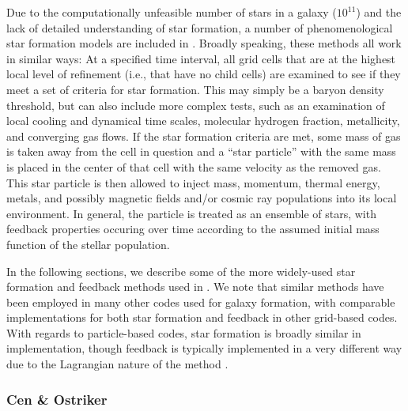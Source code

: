Due to the computationally unfeasible number of stars in a galaxy
($10^{11}$) and the lack of detailed understanding of star formation, a
number of phenomenological star formation models are included in
\enzo.
Broadly speaking, these methods all work in similar
ways: At a specified time interval, all grid cells that are at the
highest local level of refinement (i.e., that have no child cells) are
examined to see if they meet a set of criteria for star formation.
This may simply be a baryon density threshold, but can also include more
complex tests, such as an examination of local cooling and dynamical
time scales, molecular hydrogen fraction, metallicity, and converging
gas flows.  If the star formation criteria are met, some mass of gas
is taken away from the cell in question and a ``star particle'' with
the same mass is placed in the center of that cell with the same
velocity as the removed gas.  This star particle is then
allowed to inject mass, momentum, thermal energy, metals, and possibly
magnetic fields and/or cosmic ray populations into its local
environment.  In general, the particle is treated as an ensemble of
stars, with feedback properties occuring over time according to the
assumed initial mass function of the stellar population.

In the following sections, we describe some of the more widely-used
star formation and feedback methods used in \enzo.  We note that
similar methods have been employed in many other codes used for galaxy
formation, with comparable implementations for both star formation and
feedback in other grid-based codes.  With regards to particle-based
codes, star formation is broadly similar in implementation, though
feedback is typically implemented in a very different way due to the
Lagrangian nature of the method \citep[see,
e.g.,][]{sh03a,sh03b,hs03}.

\subsubsection{Cen \& Ostriker}
\label{sec:starform_cen}

